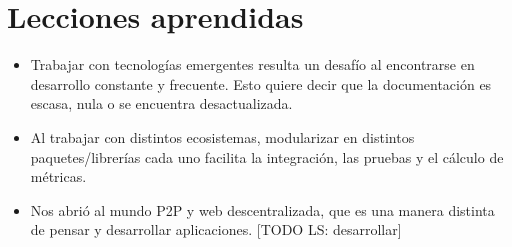 \section{Lecciones aprendidas}

\begin{itemize}
    \item Trabajar con tecnologías emergentes resulta un desafío al encontrarse en desarrollo constante y frecuente. Esto quiere decir que la documentación es escasa, nula o se encuentra desactualizada.
    
    \item Al trabajar con distintos ecosistemas, modularizar en distintos paquetes/librerías cada uno facilita la integración, las pruebas y el cálculo de métricas.

    \item Nos abrió al mundo P2P y web descentralizada, que es una manera distinta de pensar y desarrollar aplicaciones. [TODO LS: desarrollar]

\end{itemize}